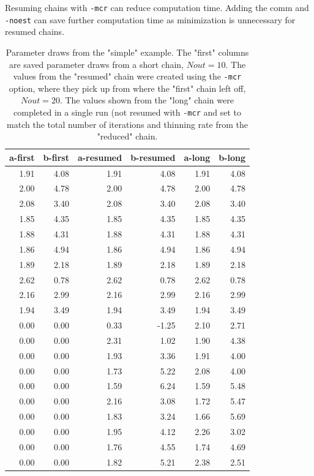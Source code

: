 \documentclass{article}\usepackage[]{graphicx}\usepackage[]{color}
\begin{document}
Resuming chains with \texttt{-mcr} can reduce computation time. Adding the comm
and \texttt{-noest} can save further computation time as minimization is 
unnecessary for resumed chains.

\begin{table}[ht]
\centering
\begin{tabular}{rrrrrr}
  \hline
  a-first & b-first & a-resumed & b-resumed & a-long & b-long \\ 
  \hline
  1.91 & 4.08 & 1.91 & 4.08 & 1.91 & 4.08 \\ 
  2.00 & 4.78 & 2.00 & 4.78 & 2.00 & 4.78 \\ 
  2.08 & 3.40 & 2.08 & 3.40 & 2.08 & 3.40 \\ 
  1.85 & 4.35 & 1.85 & 4.35 & 1.85 & 4.35 \\ 
  1.88 & 4.31 & 1.88 & 4.31 & 1.88 & 4.31 \\ 
  1.86 & 4.94 & 1.86 & 4.94 & 1.86 & 4.94 \\ 
  1.89 & 2.18 & 1.89 & 2.18 & 1.89 & 2.18 \\ 
  2.62 & 0.78 & 2.62 & 0.78 & 2.62 & 0.78 \\ 
  2.16 & 2.99 & 2.16 & 2.99 & 2.16 & 2.99 \\ 
  1.94 & 3.49 & 1.94 & 3.49 & 1.94 & 3.49 \\ 
  0.00 & 0.00 & 0.33 & -1.25 & 2.10 & 2.71 \\ 
  0.00 & 0.00 & 2.31 & 1.02 & 1.90 & 4.38 \\ 
  0.00 & 0.00 & 1.93 & 3.36 & 1.91 & 4.00 \\ 
  0.00 & 0.00 & 1.73 & 5.22 & 2.08 & 4.00 \\ 
  0.00 & 0.00 & 1.59 & 6.24 & 1.59 & 5.48 \\ 
  0.00 & 0.00 & 2.16 & 3.08 & 1.72 & 5.47 \\ 
  0.00 & 0.00 & 1.83 & 3.24 & 1.66 & 5.69 \\ 
  0.00 & 0.00 & 1.95 & 4.12 & 2.26 & 3.02 \\ 
  0.00 & 0.00 & 1.76 & 4.55 & 1.74 & 4.69 \\ 
  0.00 & 0.00 & 1.82 & 5.21 & 2.38 & 2.51 \\ 
   \hline
\end{tabular}
\caption{Parameter draws from the "simple" example. The "first" columns are saved 
parameter draws from a short chain, $Nout=10$. The values from the "resumed" chain
were created using the \texttt{-mcr} option, where they pick up from where the 
"first" chain left off, $Nout=20$. The values shown from the "long" chain 
were completed in a single run (not resumed with \texttt{-mcr} and set to match 
the total number of iterations and thinning rate from the "reduced" chain.}
\label{tab:mcr_table}
\end{table}
\end{document}
